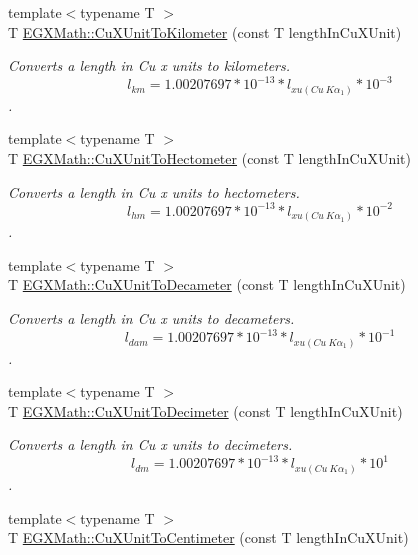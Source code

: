 \begin{DoxyCompactItemize}
{\footnotesize template$<$typename T $>$ }\\T \mbox{\hyperlink{group___e_g_x_math-_conversions-_length_conversions-_non-_s_i-_cu_x_unit-_s_i_ga8a35facc4ac2da0fdda3cfe2bfb22d5c}{E\+G\+X\+Math\+::\+Cu\+X\+Unit\+To\+Kilometer}} (const T length\+In\+Cu\+X\+Unit)
\begin{DoxyCompactList}\small\item\em Converts a length in Cu x units to kilometers. \[ l_{km}=1.00207697*10^{-13} * l_{xu(Cu\ K\alpha_1)} * 10^{-3} \]. \end{DoxyCompactList}\item 
{\footnotesize template$<$typename T $>$ }\\T \mbox{\hyperlink{group___e_g_x_math-_conversions-_length_conversions-_non-_s_i-_cu_x_unit-_s_i_ga2174090c2a3f2fefcb6a1e5ac8e2e903}{E\+G\+X\+Math\+::\+Cu\+X\+Unit\+To\+Hectometer}} (const T length\+In\+Cu\+X\+Unit)
\begin{DoxyCompactList}\small\item\em Converts a length in Cu x units to hectometers. \[ l_{hm}=1.00207697*10^{-13} * l_{xu(Cu\ K\alpha_1)} * 10^{-2} \]. \end{DoxyCompactList}\item 
{\footnotesize template$<$typename T $>$ }\\T \mbox{\hyperlink{group___e_g_x_math-_conversions-_length_conversions-_non-_s_i-_cu_x_unit-_s_i_ga6cf28db3962415cbd82d90f2df49a8e2}{E\+G\+X\+Math\+::\+Cu\+X\+Unit\+To\+Decameter}} (const T length\+In\+Cu\+X\+Unit)
\begin{DoxyCompactList}\small\item\em Converts a length in Cu x units to decameters. \[ l_{dam}=1.00207697*10^{-13} * l_{xu(Cu\ K\alpha_1)} * 10^{-1} \]. \end{DoxyCompactList}\item 
{\footnotesize template$<$typename T $>$ }\\T \mbox{\hyperlink{group___e_g_x_math-_conversions-_length_conversions-_non-_s_i-_cu_x_unit-_s_i_gaef88f4d943df6afdb7eec812534dead9}{E\+G\+X\+Math\+::\+Cu\+X\+Unit\+To\+Decimeter}} (const T length\+In\+Cu\+X\+Unit)
\begin{DoxyCompactList}\small\item\em Converts a length in Cu x units to decimeters. \[ l_{dm}=1.00207697*10^{-13} * l_{xu(Cu\ K\alpha_1)} * 10^{1} \]. \end{DoxyCompactList}\item 
{\footnotesize template$<$typename T $>$ }\\T \mbox{\hyperlink{group___e_g_x_math-_conversions-_length_conversions-_non-_s_i-_cu_x_unit-_s_i_gac30da492d2b67c1d9c3587bdcf84e370}{E\+G\+X\+Math\+::\+Cu\+X\+Unit\+To\+Centimeter}} (const T length\+In\+Cu\+X\+Unit)

\end{DoxyCompactItemize}
